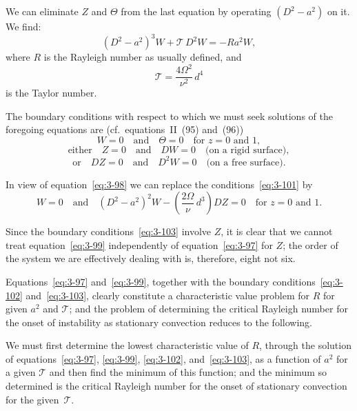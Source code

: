 We can eliminate $Z$ and $\Theta$ from the last equation by operating $(D^2 - a^2)$ on it. We find:
\begin{equation}\label{eq:3-99}
(D^2 - a^2)^3 W + \mathscr{T}\,D^2 W = -Ra^2 W,
\end{equation}
where $R$ is the Rayleigh number as usually defined, and
\begin{equation}\label{eq:3-100}
\mathscr{T} = \frac{4\Omega^2}{\nu^2}\,d^4
\end{equation}
is the Taylor number.

The boundary conditions with respect to which we must seek solutions of the foregoing equations are (cf.\ equations~II~(95) and~(96))
\begin{equation}\label{eq:3-101}
W = 0 \quad \text{and} \quad \Theta = 0 \quad \text{for } z = 0 \text{ and } 1,
\end{equation}
\begin{equation}\label{eq:3-102}
\text{either}\quad Z = 0 \quad \text{and} \quad DW = 0 \quad \text{(on a rigid surface)},
\end{equation}
\begin{equation*}
\text{or}\quad DZ = 0 \quad \text{and} \quad D^2 W = 0 \quad \text{(on a free surface)}.
\end{equation*}

In view of equation~\eqref{eq:3-98} we can replace the conditions~\eqref{eq:3-101} by
\begin{equation}\label{eq:3-103}
W = 0 \quad \text{and} \quad (D^2 - a^2)^2 W - \left(\frac{2\Omega}{\nu}\,d^3\right)\!DZ = 0 \quad \text{for } z = 0 \text{ and } 1.
\end{equation}

Since the boundary conditions~\eqref{eq:3-103} involve $Z$, it is clear that we cannot treat equation~\eqref{eq:3-99} independently of equation~\eqref{eq:3-97} for $Z$; the order of the system we are effectively dealing with is, therefore, eight not six.

Equations~\eqref{eq:3-97} and~\eqref{eq:3-99}, together with the boundary conditions~\eqref{eq:3-102} and~\eqref{eq:3-103}, clearly constitute a characteristic value problem for $R$ for given $a^2$ and $\mathscr{T}$; and the problem of determining the critical Rayleigh number for the onset of instability as stationary convection reduces to the following.

We must first determine the lowest characteristic value of $R$, through the solution of equations~\eqref{eq:3-97}, \eqref{eq:3-99}, \eqref{eq:3-102}, and~\eqref{eq:3-103}, as a function of $a^2$ for a given $\mathscr{T}$ and then find the minimum of this function; and the minimum so determined is the critical Rayleigh number for the onset of stationary convection for the given~$\mathscr{T}$.

